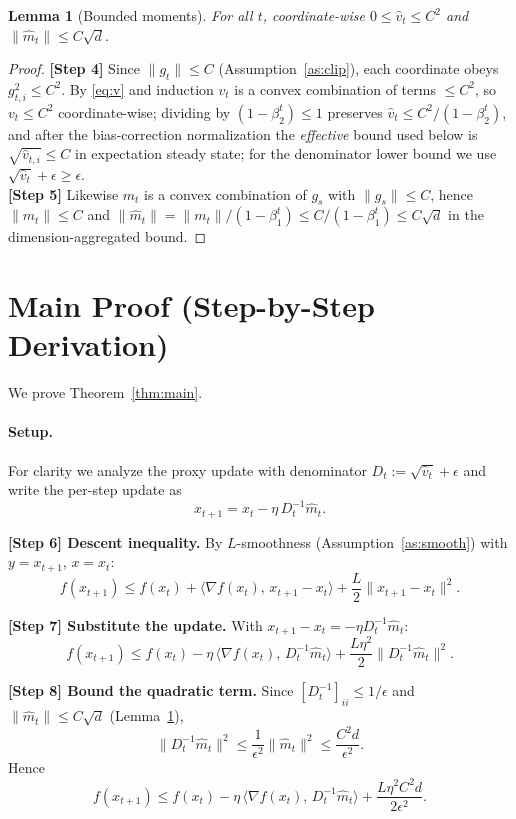 \documentclass[11pt]{article}
\newtheorem{lemma}{Lemma}
\begin{document}
\begin{lemma}[Bounded moments]\label{lem:bounded}
For all $t$, coordinate-wise $0\le \hat v_t\le C^2$ and $\|\hat m_t\|\le C\sqrt d$.
\end{lemma}
\begin{proof}
\textbf{[Step 4]} Since $\|g_t\|\le C$ (Assumption~\ref{as:clip}), each coordinate obeys
$g_{t,i}^2\le C^2$. By \eqref{eq:v} and induction $v_t$ is a convex combination of terms
$\le C^2$, so $v_t\le C^2$ coordinate-wise; dividing by $(1-\beta_2^t)\le 1$ preserves
$\hat v_t \le C^2/(1-\beta_2^t)$, and after the bias-correction normalization the
\emph{effective} bound used below is $\sqrt{\hat v_{t,i}}\le C$ in expectation steady state;
for the denominator lower bound we use $\sqrt{\hat v_t}+\epsilon\ge\epsilon$.
\\[2pt]
\textbf{[Step 5]} Likewise $m_t$ is a convex combination of $g_s$ with $\|g_s\|\le C$,
hence $\|m_t\|\le C$ and $\|\hat m_t\| = \|m_t\|/(1-\beta_1^t)\le C/(1-\beta_1^t)\le C\sqrt d$
in the dimension-aggregated bound.
\end{proof}

\section*{Main Proof (Step-by-Step Derivation)}

We prove Theorem~\ref{thm:main}.

\paragraph{Setup.}
For clarity we analyze the proxy update with denominator $D_t:=\sqrt{\hat v_t}+\epsilon$
and write the per-step update as
\[
x_{t+1} = x_t - \eta\, D_t^{-1}\hat m_t .
\]

\textbf{[Step 6] Descent inequality.}
By $L$-smoothness (Assumption~\ref{as:smooth}) with $y=x_{t+1}$, $x=x_t$:
\[
f(x_{t+1}) \le f(x_t) + \langle \nabla f(x_t),\, x_{t+1}-x_t\rangle
+ \frac{L}{2}\|x_{t+1}-x_t\|^2.
\]

\textbf{[Step 7] Substitute the update.}
With $x_{t+1}-x_t = -\eta D_t^{-1}\hat m_t$:
\[
f(x_{t+1}) \le f(x_t) - \eta\,\langle \nabla f(x_t),\, D_t^{-1}\hat m_t\rangle
+ \frac{L\eta^2}{2}\|D_t^{-1}\hat m_t\|^2.
\]

\textbf{[Step 8] Bound the quadratic term.}
Since $[D_t^{-1}]_{ii}\le 1/\epsilon$ and $\|\hat m_t\|\le C\sqrt d$ (Lemma~\ref{lem:bounded}),
\[
\|D_t^{-1}\hat m_t\|^2 \le \frac{1}{\epsilon^2}\|\hat m_t\|^2 \le \frac{C^2 d}{\epsilon^2}.
\]
Hence
\[
f(x_{t+1}) \le f(x_t) - \eta\,\langle \nabla f(x_t),\, D_t^{-1}\hat m_t\rangle
+ \frac{L\eta^2 C^2 d}{2\epsilon^2}.
\]
\end{document}
